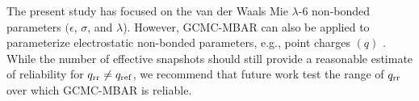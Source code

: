 \documentclass[journal=jced,manuscript=article]{achemso}
\begin{document}
The present study has focused on the van der Waals Mie $\lambda$-6 non-bonded parameters $(\epsilon$, $\sigma$, and $\lambda$). However, GCMC-MBAR can also be applied to parameterize electrostatic non-bonded parameters, e.g., point charges $(q)$ \cite{naden:jctc:2016}. While the number of effective snapshots should still provide a reasonable estimate of reliability for $q_{\rm rr} \neq q_{\rm ref}$, we recommend that future work test the range of $q_{\rm rr}$ over which GCMC-MBAR is reliable.





\end{document}
